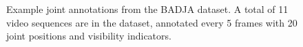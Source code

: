  \begin{figure}[t]
  \def\bb{\rule{2in}{0pt}\rule{0pt}{1in}}
  \begin{center}
  \end{center}
  \caption{Example joint annotations from the BADJA dataset.  A total of 11 video sequences are in the dataset, annotated every 5 frames with 20 joint positions and visibility indicators.
  }
  \label{fig:badja_examples}
  \end{figure}
  
  
